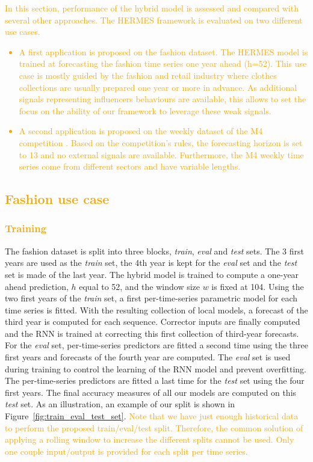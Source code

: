 \documentclass[10pt]{article} %
\newcommand{\lag}{h}
\newcommand{\window}{w}
\begin{document}
\textcolor{orange}{In this section, performance of the hybrid model is assessed and compared with several other approaches. The HERMES framework is evaluated on two different use cases.
\begin{itemize}
	\item A first application is proposed on the fashion dataset. The HERMES model is trained at forecasting the fashion time series one year ahead (h=52). This use case is mostly guided by the fashion and retail industry where clothes collections are usually prepared one year or more in advance. As additional signals representing influencers behaviours are available, this allows  to set the focus on the ability of our framework to leverage these weak signals.
	\item A second application is proposed on the weekly dataset of the M4 competition \citep{makridakis2018}. Based on the competition's rules, the forecasting horizon is set to 13 and no external signals are available. Furthermore, the M4 weekly time series come from different sectors and have variable lengths.
\end{itemize}
}

\textcolor{orange}{\subsection{Fashion use case}}

\textcolor{orange}{\subsubsection{Training}}
The fashion dataset is split into three blocks, {\em train}, {\em eval} and {\em test} sets. The 3 first years are used as the {\em train} set, the 4th year is kept for the {\em eval} set and the {\em test} set is made of the last year. The hybrid model is trained to compute a one-year ahead prediction, $\lag$ equal to 52, and the window size $\window$ is fixed at 104.
Using the two first years of the {\em train} set, a first per-time-series parametric model for each time series is fitted. With the resulting collection of local models, a forecast of the third year is computed for each sequence. Corrector inputs are finally computed and the RNN is trained at correcting this first collection of third-year forecasts. For the {\em eval} set, per-time-series predictors are fitted a second time using the three first years and forecasts of the fourth year are computed. The {\em eval} set is used during  training to control the learning of the RNN model and prevent overfitting. The per-time-series predictors are fitted a last time for the {\em test} set using the four first years. The final accuracy measures of all our models are computed on this {\em test} set. As an illustration, an example of our split is shown in Figure~\ref{fig:train_eval_test_set}. \textcolor{orange}{Note that we have just enough historical data to perform the proposed train/eval/test split. Therefore, the common solution of applying a rolling window to increase the different splits cannot be used. Only one couple input/output is provided for each split per time series.}
\end{document}
